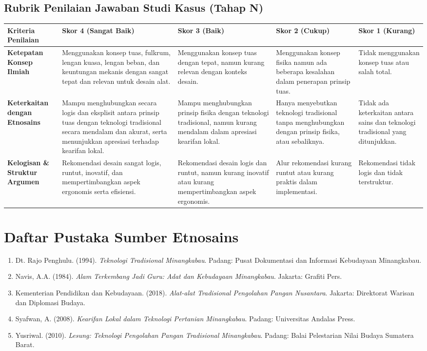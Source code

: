 \documentclass[a4paper,12pt]{article}
\begin{document}
\subsection{Rubrik Penilaian Jawaban Studi Kasus (Tahap N)}

\begin{longtable}{|p{3cm}|p{3cm}|p{3cm}|p{3cm}|p{3cm}|}
\hline
\textbf{Kriteria Penilaian} & \textbf{Skor 4 (Sangat Baik)} & \textbf{Skor 3 (Baik)} & \textbf{Skor 2 (Cukup)} & \textbf{Skor 1 (Kurang)} \\
\hline
\textbf{Ketepatan Konsep Ilmiah} & Menggunakan konsep tuas, fulkrum, lengan kuasa, lengan beban, dan keuntungan mekanis dengan sangat tepat dan relevan untuk desain alat. & Menggunakan konsep tuas dengan tepat, namun kurang relevan dengan konteks desain. & Menggunakan konsep fisika namun ada beberapa kesalahan dalam penerapan prinsip tuas. & Tidak menggunakan konsep tuas atau salah total. \\
\hline
\textbf{Keterkaitan dengan Etnosains} & Mampu menghubungkan secara logis dan eksplisit antara prinsip tuas dengan teknologi tradisional secara mendalam dan akurat, serta menunjukkan apresiasi terhadap kearifan lokal. & Mampu menghubungkan prinsip fisika dengan teknologi tradisional, namun kurang mendalam dalam apresiasi kearifan lokal. & Hanya menyebutkan teknologi tradisional tanpa menghubungkan dengan prinsip fisika, atau sebaliknya. & Tidak ada keterkaitan antara sains dan teknologi tradisional yang ditunjukkan. \\
\hline
\textbf{Kelogisan \& Struktur Argumen} & Rekomendasi desain sangat logis, runtut, inovatif, dan mempertimbangkan aspek ergonomis serta efisiensi. & Rekomendasi desain logis dan runtut, namun kurang inovatif atau kurang mempertimbangkan aspek ergonomis. & Alur rekomendasi kurang runtut atau kurang praktis dalam implementasi. & Rekomendasi tidak logis dan tidak terstruktur. \\
\hline
\end{longtable}

\section{Daftar Pustaka Sumber Etnosains}

\begin{enumerate}
\item Dt. Rajo Penghulu. (1994). \textit{Teknologi Tradisional Minangkabau}. Padang: Pusat Dokumentasi dan Informasi Kebudayaan Minangkabau.
\item Navis, A.A. (1984). \textit{Alam Terkembang Jadi Guru: Adat dan Kebudayaan Minangkabau}. Jakarta: Grafiti Pers.
\item Kementerian Pendidikan dan Kebudayaan. (2018). \textit{Alat-alat Tradisional Pengolahan Pangan Nusantara}. Jakarta: Direktorat Warisan dan Diplomasi Budaya.
\item Syafwan, A. (2008). \textit{Kearifan Lokal dalam Teknologi Pertanian Minangkabau}. Padang: Universitas Andalas Press.
\item Yusriwal. (2010). \textit{Lesung: Teknologi Pengolahan Pangan Tradisional Minangkabau}. Padang: Balai Pelestarian Nilai Budaya Sumatera Barat.
\end{enumerate}
\end{document}
